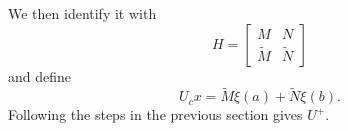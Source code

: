 \documentclass[11pt, oneside, a4paper]{article}
\begin{document}

We then identify it with
\[H = \begin{bmatrix}M&N\\ \tilde{M} & \tilde{N}\end{bmatrix}\]
and define
\[U_c x = \tilde{M}\xi(a) + \tilde{N}\xi(b).\]
Following the steps in the previous section gives $U^+$.
\end{document}
